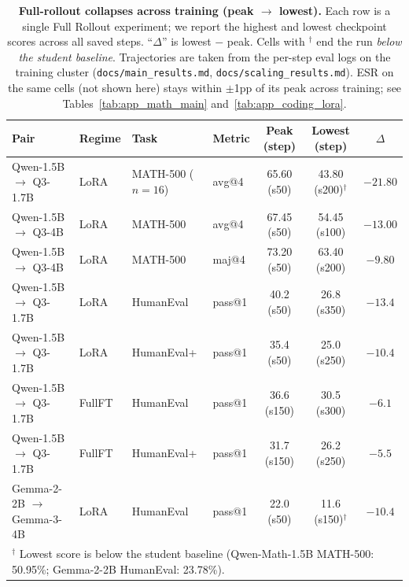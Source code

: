 \documentclass{article}
\newcommand{\method}{ESR}
\begin{document}
\begin{table}[!htbp]
\centering
\caption{\textbf{Full-rollout collapses across training (peak $\rightarrow$ lowest).} Each row is a single Full Rollout experiment; we report the highest and lowest checkpoint scores across all saved steps. ``$\Delta$'' is lowest $-$ peak. Cells with $^{\dagger}$ end the run \emph{below the student baseline}. Trajectories are taken from the per-step eval logs on the training cluster (\texttt{docs/main\_results.md}, \texttt{docs/scaling\_results.md}). \method{} on the same cells (not shown here) stays within $\pm$1pp of its peak across training; see Tables~\ref{tab:app_math_main} and~\ref{tab:app_coding_lora}.}
\label{tab:app_fullseq_collapse}
\footnotesize
\begin{tabular}{llllccc}
\toprule
\textbf{Pair} & \textbf{Regime} & \textbf{Task} & \textbf{Metric} & \textbf{Peak (step)} & \textbf{Lowest (step)} & \textbf{$\Delta$} \\
\midrule
Qwen-1.5B $\rightarrow$ Q3-1.7B & LoRA   & MATH-500 ($n{=}16$) & avg@4   & 65.60 (s50)  & 43.80 (s200)$^{\dagger}$ & $\mathbf{-21.80}$ \\
Qwen-1.5B $\rightarrow$ Q3-4B   & LoRA   & MATH-500            & avg@4   & 67.45 (s50)  & 54.45 (s100)             & $-13.00$ \\
Qwen-1.5B $\rightarrow$ Q3-4B   & LoRA   & MATH-500            & maj@4   & 73.20 (s50)  & 63.40 (s200)             & $-9.80$  \\
\midrule
Qwen-1.5B $\rightarrow$ Q3-1.7B & LoRA   & HumanEval           & pass@1  & 40.2 (s50)   & 26.8 (s350)              & $-13.4$ \\
Qwen-1.5B $\rightarrow$ Q3-1.7B & LoRA   & HumanEval+          & pass@1  & 35.4 (s50)   & 25.0 (s250)              & $-10.4$ \\
Qwen-1.5B $\rightarrow$ Q3-1.7B & FullFT & HumanEval           & pass@1  & 36.6 (s150)  & 30.5 (s300)              & $-6.1$  \\
Qwen-1.5B $\rightarrow$ Q3-1.7B & FullFT & HumanEval+          & pass@1  & 31.7 (s150)  & 26.2 (s250)              & $-5.5$  \\
Gemma-2-2B $\rightarrow$ Gemma-3-4B & LoRA & HumanEval         & pass@1  & 22.0 (s50)   & 11.6 (s150)$^{\dagger}$  & $\mathbf{-10.4}$ \\
\bottomrule
\multicolumn{7}{l}{\footnotesize $^{\dagger}$ Lowest score is below the student baseline (Qwen-Math-1.5B MATH-500: 50.95\%; Gemma-2-2B HumanEval: 23.78\%).}
\end{tabular}
\end{table}
\end{document}

